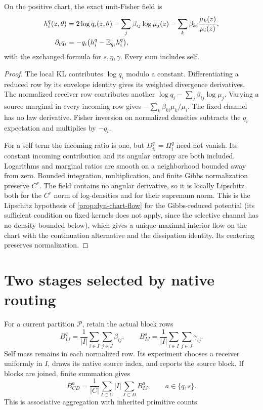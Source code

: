 On the positive chart, the exact unit-Fisher field is
\begin{equation}
\begin{split}
h_i^q(z,\theta)
&=2\log q_i(z,\theta)-\sum_j\beta_{ij}\log\mu_j(z)
-\sum_k\beta_{ki}\frac{\mu_k(z)}{\mu_i(z)},\\
\partial_tq_i&=-q_i\bigl(h_i^q-\mathbb E_{q_i}h_i^q\bigr),
\end{split}
\label{open:full-field}
\end{equation}
with the exchanged formula for $s,\eta,\gamma$. Every sum includes self.
\begin{proof}
The local KL contributes $\log q_i$ modulo a constant. Differentiating a reduced row by its envelope identity gives its weighted divergence derivatives. The normalized receiver row contributes another $\log q_i-\sum_j\beta_{ij}\log\mu_j$. Varying a source marginal in every incoming row gives $-\sum_k\beta_{ki}\mu_k/\mu_i$. The fixed channel has no law derivative. Fisher inversion on normalized densities subtracts the $q_i$ expectation and multiplies by $-q_i$.

For a self term the incoming ratio is one, but $D^q_{ii}=H_i^q$ need not vanish. Its constant incoming contribution and its angular entropy are both included. Logarithms and marginal ratios are smooth on a neighborhood bounded away from zero. Bounded integration, multiplication, and finite Gibbs normalization preserve $C^r$. The field contains no angular derivative, so it is locally Lipschitz both for the $C^r$ norm of log-densities and for their supremum norm. This is the Lipschitz hypothesis of \cref{prop:dyn-chart-flow} for the Gibbs-reduced potential (its sufficient condition on fixed kernels does not apply, since the selective channel has no density bounded below), which gives a unique maximal interior flow on the chart with the continuation alternative and the dissipation identity. Its centering preserves normalization.
\end{proof}

\section{Two stages selected by native routing}

For a current partition $\mathcal P$, retain the actual block rows
\begin{equation}
B^q_{IJ}=\frac1{|I|}\sum_{i\in I}\sum_{j\in J}\beta_{ij},
\qquad
B^s_{IJ}=\frac1{|I|}\sum_{i\in I}\sum_{j\in J}\gamma_{ij}.
\label{open:block-row}
\end{equation}
Self mass remains in each normalized row. Its experiment chooses a receiver uniformly in $I$, draws its native source index, and reports the source block. If blocks are joined, finite summation gives
\begin{equation}
B^a_{CD}
=\frac1{|C|}\sum_{I\subset C}|I|\sum_{J\subset D}B^a_{IJ},
\qquad a\in\{q,s\}.
\label{open:row-recursion}
\end{equation}
This is associative aggregation with inherited primitive counts.

